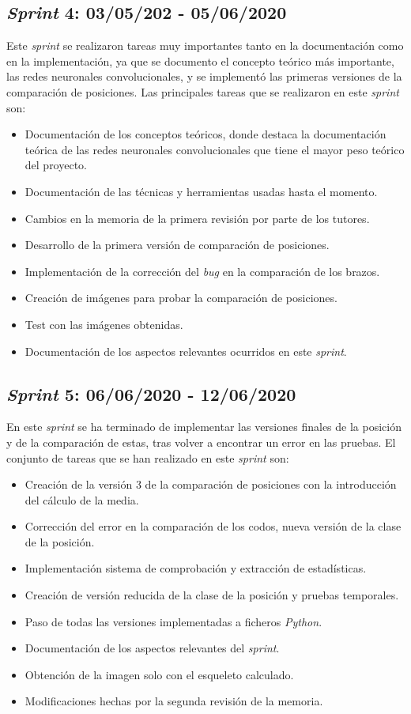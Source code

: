 \subsection{\textit{Sprint} 4: 03/05/202 - 05/06/2020}
Este \textit{sprint} se realizaron tareas muy importantes tanto en la documentación como en la implementación, ya que se documento el concepto teórico más importante, las redes neuronales convolucionales, y se implementó las primeras versiones de la comparación de posiciones. Las principales tareas que se realizaron en este \textit{sprint} son:
\begin{itemize}
	\item Documentación de los conceptos teóricos, donde destaca la documentación teórica de las redes neuronales convolucionales que tiene el mayor peso teórico del proyecto.
	\item Documentación de las técnicas y herramientas usadas hasta el momento.
	\item Cambios en la memoria de la primera revisión por parte de los tutores.
	\item Desarrollo de la primera versión de comparación de posiciones.
	\item Implementación de la corrección del \textit{bug} en la comparación de los brazos.
	\item Creación de imágenes para probar la comparación de posiciones.
	\item Test con las imágenes obtenidas.
	\item Documentación de los aspectos relevantes ocurridos en este \textit{sprint}. 
\end{itemize}

\subsection{\textit{Sprint} 5: 06/06/2020 - 12/06/2020}
En este \textit{sprint} se ha terminado de implementar las versiones finales de la posición y de la comparación de estas, tras volver a encontrar un error en las pruebas. El conjunto de tareas que se han realizado en este \textit{sprint} son:
\begin{itemize}
	\item Creación de la versión 3 de la comparación de posiciones con la introducción del cálculo de la media.
	\item Corrección del error en la comparación de los codos, nueva versión de la clase de la posición.
	\item Implementación sistema de comprobación y extracción de estadísticas.
	\item Creación de versión reducida de la clase de la posición y pruebas temporales.
	\item Paso de todas las versiones implementadas a ficheros \textit{Python}.
	\item Documentación de los aspectos relevantes del \textit{sprint}.
	\item Obtención de la imagen solo con el esqueleto calculado.
	\item Modificaciones hechas por la segunda revisión de la memoria.
\end{itemize}


